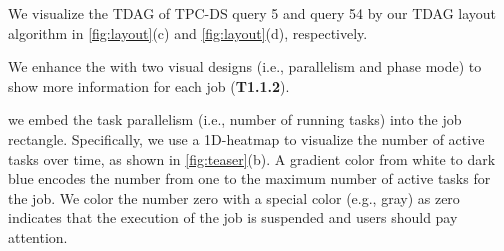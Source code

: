 We visualize the TDAG of TPC-DS query 5 and query 54 by our TDAG layout algorithm in \autoref{fig:layout}(c) and \autoref{fig:layout}(d), respectively. 


We enhance the  with two visual designs (i.e., parallelism and phase mode) to show more information for each job (\textbf{T1.1.2}). 

 we embed the task parallelism (i.e., number of running tasks) into the job rectangle. Specifically, we use a 1D-heatmap to visualize the number of active tasks over time, as shown in \autoref{fig:teaser}(b). 
A gradient color from white to dark blue encodes the number from one to the maximum number of active tasks for the job. We color the number zero with a special color (e.g., gray) as zero indicates that the execution of the job is suspended and users should pay attention. 


